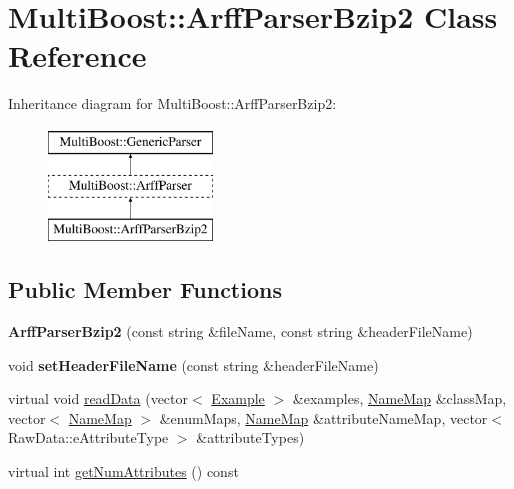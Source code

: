 \hypertarget{classMultiBoost_1_1ArffParserBzip2}{\section{Multi\-Boost\-:\-:Arff\-Parser\-Bzip2 Class Reference}
\label{classMultiBoost_1_1ArffParserBzip2}
}
Inheritance diagram for Multi\-Boost\-:\-:Arff\-Parser\-Bzip2\-:\begin{figure}[H]
\begin{center}
\leavevmode
\includegraphics[height=3.000000cm]{classMultiBoost_1_1ArffParserBzip2}
\end{center}
\end{figure}
\subsection*{Public Member Functions}
\begin{DoxyCompactItemize}
\item 
\hypertarget{classMultiBoost_1_1ArffParserBzip2_addf7ddde5ad871571071425be82a2a9c}{{\bfseries Arff\-Parser\-Bzip2} (const string \&file\-Name, const string \&header\-File\-Name)}\label{classMultiBoost_1_1ArffParserBzip2_addf7ddde5ad871571071425be82a2a9c}

\item 
\hypertarget{classMultiBoost_1_1ArffParserBzip2_afd249dd1ff41dc57264e5a520f57c695}{void {\bfseries set\-Header\-File\-Name} (const string \&header\-File\-Name)}\label{classMultiBoost_1_1ArffParserBzip2_afd249dd1ff41dc57264e5a520f57c695}

\item 
virtual void \hyperlink{classMultiBoost_1_1ArffParserBzip2_a6f122a7b4a997e5deb7939253c4131c4}{read\-Data} (vector$<$ \hyperlink{classMultiBoost_1_1Example}{Example} $>$ \&examples, \hyperlink{classMultiBoost_1_1NameMap}{Name\-Map} \&class\-Map, vector$<$ \hyperlink{classMultiBoost_1_1NameMap}{Name\-Map} $>$ \&enum\-Maps, \hyperlink{classMultiBoost_1_1NameMap}{Name\-Map} \&attribute\-Name\-Map, vector$<$ Raw\-Data\-::e\-Attribute\-Type $>$ \&attribute\-Types)
\item 
virtual int \hyperlink{classMultiBoost_1_1ArffParserBzip2_a0be90fb6c0e87f1d7962effcd2a647cb}{get\-Num\-Attributes} () const 
\end{DoxyCompactItemize}
